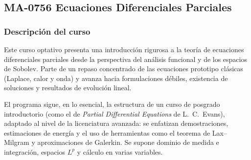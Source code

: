 \newpage
\subsection*{MA-0756 Ecuaciones Diferenciales Parciales}

\hypertarget{MA0756}{}
\begin{refsection}
\begin{table}[H]
\end{table}

\subsubsection*{Descripción del curso}

Este curso optativo presenta una introducción rigurosa a la teoría de ecuaciones diferenciales parciales desde la perspectiva del análisis funcional y de los espacios de Sobolev. Parte de un repaso concentrado de las ecuaciones prototipo clásicas (Laplace, calor y onda) y avanza hacia formulaciones débiles, existencia de soluciones y resultados de evolución lineal.

El programa sigue, en lo esencial, la estructura de un curso de posgrado introductorio (como el de \emph{Partial Differential Equations} de L.~C.~Evans), adaptado al nivel de la licenciatura avanzada: se enfatizan demostraciones, estimaciones de energía y el uso de herramientas como el teorema de Lax--Milgram y aproximaciones de Galerkin. Se supone dominio de medida e integración, espacios $L^p$ y cálculo en varias variables.


\end{refsection}
